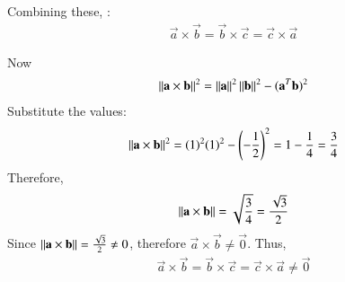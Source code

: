 \documentclass[journal]{IEEEtran}
\begin{document}
Combining these, :
\begin{align}
    \vec{a} \times \vec{b} = \vec{b} \times \vec{c} = \vec{c} \times \vec{a}
\end{align}

Now
\begin{align}
    \left\lVert\mathbf{a} \times \mathbf{b}\right\rVert^2 = \left\lVert\mathbf{a}\right\rVert^2 \left\lVert\mathbf{b}\right\rVert^2 - (\mathbf{a}^T \mathbf{b})^2
\end{align}
Substitute the values:
\begin{align}
    \left\lVert\mathbf{a} \times \mathbf{b}\right\rVert^2 = (1)^2 (1)^2 - \left(-\frac{1}{2}\right)^2 = 1 - \frac{1}{4} = \frac{3}{4}
\end{align}
Therefore,
\begin{align}
    \left\lVert\mathbf{a} \times \mathbf{b}\right\rVert = \sqrt{\frac{3}{4}} = \frac{\sqrt{3}}{2}
\end{align}
Since $\left\lVert\mathbf{a} \times \mathbf{b}\right\rVert = \frac{\sqrt{3}}{2} \neq 0$, therefore $\vec{a} \times \vec{b} \neq \vec{0}$.
Thus,
\begin{align}
    \vec{a} \times \vec{b} = \vec{b} \times \vec{c} = \vec{c} \times \vec{a} \neq \vec{0}
\end{align}
\end{document}
